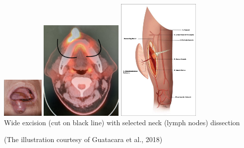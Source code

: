 \documentclass[
paper=landscape,
paper=160mm:90mm, %
fontsize=11pt, %
pagesize, %
parskip=half-, %
]{scrartcl} %
\theoremstyle{mythmstyle} %
\begin{document}
{\includegraphics[width=2cm]{IMG_7174.jpg}
\includegraphics[width=4cm]{IMG_6430.jpg} %
\includegraphics[width=4cm]{Figure-5-Vascular-anatomy-of-ALT-flap-Guatacara-et-al-2018_W640.jpg}\\
\large Wide excision (cut on black line) with selected neck (lymph nodes) dissection\\
\hspace{2cm} 
{\tiny (The illustration courtesy of Guatacara et al., 2018) \par}


}
\end{document}
